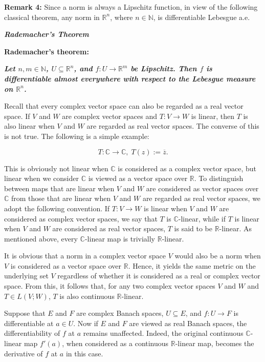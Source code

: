 \documentclass{book}
\begin{document}
\textbf{Remark 4:} Since a norm is always a Lipschitz function, in view of the following classical theorem, any norm in $\mathbb{R}^n$, where $n \in \mathbb{N}$, is differentiable Lebesgue a.e.

\begin{center}
{\LARGE \textbf{\textit{Rademacher’s Theorem}}}
\end{center}

\textbf{Rademacher’s theorem:}

\textbf{\textit{Let $n, m \in \mathbb{N}$, $U \subseteq \mathbb{R}^n$, and $f : U \to \mathbb{R}^m$ be Lipschitz. Then $f$ is differentiable almost everywhere with respect to the Lebesgue measure on $\mathbb{R}^n$.}}

Recall that every complex vector space can also be regarded as a real vector space. If $V$ and $W$ are complex vector spaces and $T : V \to W$ is linear, then $T$ is also linear when $V$ and $W$ are regarded as real vector spaces. The converse of this is not true. The following is a simple example:

\[
T : \mathbb{C} \to \mathbb{C}, \; T(z) := \overline{z}.
\tag{5}
\]

This is obviously not linear when $\mathbb{C}$ is considered as a complex vector space, but linear when we consider $\mathbb{C}$ is viewed as a vector space over $\mathbb{R}$. To distinguish between maps that are linear when $V$ and $W$ are considered as vector spaces over $\mathbb{C}$ from those that are linear when $V$ and $W$ are regarded as real vector spaces, we adopt the following convention. If $T : V \to W$ is linear when $V$ and $W$ are considered as complex vector spaces, we say that $T$ is $\mathbb{C}$-linear, while if $T$ is linear when $V$ and $W$ are considered as real vector spaces, $T$ is said to be $\mathbb{R}$-linear. As mentioned above, every $\mathbb{C}$-linear map is trivially $\mathbb{R}$-linear.

It is obvious that a norm in a complex vector space $V$ would also be a norm when $V$ is considered as a vector space over $\mathbb{R}$. Hence, it yields the same metric on the underlying set $V$ regardless of whether it is considered as a real or complex vector space. From this, it follows that, for any two complex vector spaces $V$ and $W$ and $T \in L(V; W)$, $T$ is also continuous $\mathbb{R}$-linear.

Suppose that $E$ and $F$ are complex Banach spaces, $U \subseteq E$, and $f : U \to F$ is differentiable at $a \in U$. Now if $E$ and $F$ are viewed as real Banach spaces, the differentiability of $f$ at $a$ remains unaffected. Indeed, the original continuous $\mathbb{C}$-linear map $f'(a)$, when considered as a continuous $\mathbb{R}$-linear map, becomes the derivative of $f$ at $a$ in this case. 
\end{document}
